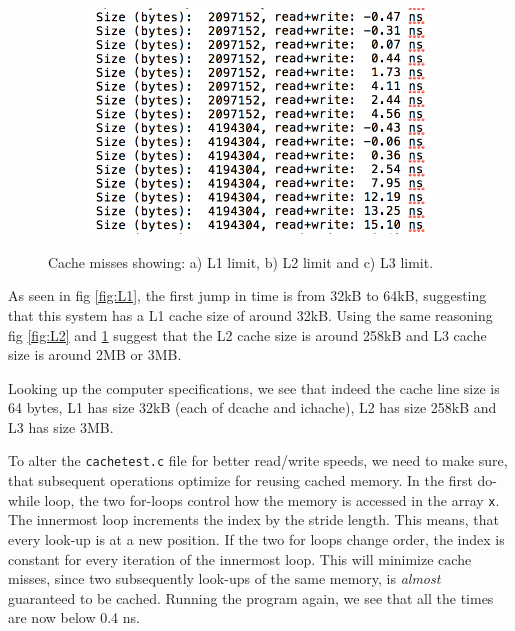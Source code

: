 \begin{figure}[ht]
    \begin{subfigure}{0.4\textwidth}
    \includegraphics[width=\linewidth]{Week4/fig/L3Miss.png}
    \caption{ }
    \label{fig:L3}
    \end{subfigure}
    
    \caption{Cache misses showing: a) L1 limit, b) L2 limit and c) L3 limit.}
    \label{fig:misses}
\end{figure}

As seen in fig \ref{fig:L1}, the first jump in time is from 32kB to 64kB, suggesting that this system has a L1 cache size of around 32kB. Using the same reasoning fig \ref{fig:L2} and \ref{fig:L3} suggest that the L2 cache size is around 258kB and L3 cache size is around 2MB or 3MB. 

Looking up the computer specifications, we see that indeed the cache line size is 64 bytes, L1 has size 32kB (each of dcache and ichache), L2 has size 258kB and L3 has size 3MB. 

To alter the \texttt{cachetest.c} file for better read/write speeds, we need to make sure, that subsequent operations optimize for reusing cached memory. In the first do-while loop, the two for-loops control how the memory is accessed in the array \texttt{x}. The innermost loop increments the index by the stride length. This means, that every look-up is at a new position. If the two for loops change order, the index is constant for every iteration of the innermost loop. This will minimize cache misses, since two subsequently look-ups of the same memory, is \textit{almost} guaranteed to be cached. Running the program again, we see that all the times are now below 0.4 ns. 

